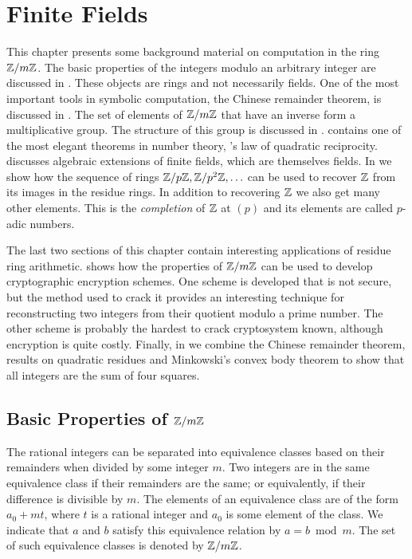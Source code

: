 \chapter{Finite Fields}
\label{Finite:Fields:Chap}

This chapter presents some background material on computation in the
ring $\mathbb{Z}/m\mathbb{Z}$.  The basic properties of the integers modulo an
arbitrary integer are discussed in .  These
objects are rings and not necessarily fields.  One of the most
important tools in symbolic computation, the Chinese remainder
theorem, is discussed in .  The
set of elements of $\mathbb{Z}/m\mathbb{Z}$ that have an inverse form a multiplicative
group.  The structure of this group is discussed in
.  
contains one of the most elegant theorems in number theory, {\Gauss}'s
law of quadratic reciprocity.  discusses
algebraic extensions of finite fields, which are themselves fields.
In  we show how the sequence of rings
$\mathbb{Z}/p\mathbb{Z}, \mathbb{Z}/p^2\mathbb{Z}, \ldots$ can be used to recover $\mathbb{Z}$ from its images
in the residue rings.  In addition to recovering $\mathbb{Z}$ we also get many
other elements.  This is the {\em completion} of $\mathbb{Z}$ at $(p)$ and its
elements are called $p$-adic numbers.

The last two sections of this chapter contain interesting applications
of residue ring arithmetic.   shows how the
properties of $\mathbb{Z}/m\mathbb{Z}$ can be used to develop cryptographic encryption
schemes.  One scheme is developed that is not secure, but the method
used to crack it provides an interesting technique for reconstructing
two integers from their quotient modulo a prime number.  The other
scheme is probably the hardest to crack cryptosystem known, although
encryption is quite costly.  Finally, in 
we combine the Chinese remainder theorem, results on quadratic
residues and Minkowski's convex body theorem to show that all integers
are the sum of four squares.

\section{Basic Properties of ${\protect\mathbb{Z}}/m{\protect\mathbb{Z}}$}
\label{FF:Basic:Sec}

The rational integers can be separated into equivalence classes based
on their remainders when divided by some integer $m$.  Two integers
are in the same equivalence class if their remainders are the same; or
equivalently, if their difference is divisible by $m$.  The elements
of an equivalence class are of the form $a_0 + m t$, where $t$ is a
rational integer and $a_0$ is some element of the class.  We indicate
that $a$ and $b$ satisfy this equivalence relation by $a = b\bmod{m}$.
The set of such equivalence classes is denoted by $\mathbb{Z}/m\mathbb{Z}$.

